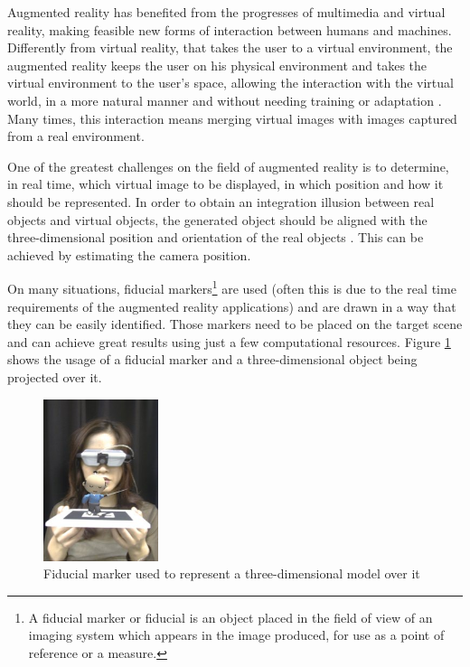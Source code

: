 \documentclass[msc, a4paper, classic, en]{ufbathesis}
\begin{document}
Augmented reality has benefited from the progresses of multimedia and virtual reality, making feasible new forms of
interaction between humans and machines. Differently from virtual reality, that takes the user to a virtual environment, the augmented
reality keeps the user on his physical environment and takes the virtual environment to the user's space, allowing the interaction with
the virtual world, in a more natural manner and without needing training or adaptation \cite{tori2006fundamentos}. Many times, this interaction means
merging virtual images with images captured from a real environment.

One of the greatest challenges on the field of augmented reality is to determine, in real time, which virtual image to be displayed,
in which position and how it should be represented. In order to obtain an integration illusion between real objects and virtual objects,
the generated object should be aligned with the three-dimensional position and orientation of the real objects \cite{gallo11}. This can be achieved
by estimating the camera position.

On many situations, fiducial markers\footnote{A fiducial marker or fiducial is an object placed in the field of view of an imaging system which appears in the image produced, for use as a point of reference or a measure.} are used (often this is due to the real time requirements of the augmented reality applications) \cite{azuma} and are drawn in a way that they can be easily identified. Those markers need to be placed on the target scene and can achieve great results using just a few computational resources. Figure \ref{fig:fiducial_marker} shows the usage of a fiducial marker and a three-dimensional object being projected over it.

\begin{figure}
\centering
\includegraphics[width=0.3\textwidth]{images/fiducial_marker.png}
\caption{Fiducial marker used to represent a three-dimensional model over it \cite{artoolkit}}
\label{fig:fiducial_marker}
\end{figure}
\end{document}
